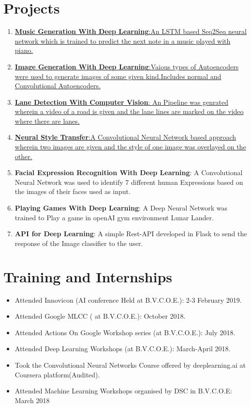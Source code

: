 \documentclass{my_cv}
\begin{document}
	\section{\colorbox{mycolor}{\textcolor{golde}{Projects}}}
	  \begin{enumerate}
	  	
	 
	  	\item \href{https://github.com/anuj2110/lstm-music-gen}{\textbf{Music Generation With Deep Learning}:An LSTM based Seq2Seq neural network which is trained to predict the next note in a music played with piano.}
	  	
	  	\item \href{https://github.com/anuj2110/keras}{\textbf{Image Generation With Deep Learning}:Vaious types of Autoencoders were used to generate images of some given kind.Includes normal and Convolutional Autoencoders.}
	  	\item \href{https://github.com/anuj2110/LaneDetection}{ \textbf{Lane Detection With Computer Vision}:
	  		An Pipeline was genrated wherein a video of a road is given and the lane lines are marked on the video where there are lanes.}
	  	\item \href{https://github.com/anuj2110/neural-style-transfer}{\textbf{Neural Style Transfer}:A Convolutional Neural Network based approach wherein two images are given and the style of one image was overlayed on the other.}
	  	\item \textbf{Facial Expression Recognition With Deep Learning}:
	  	A Convolutional Neural Network was used to identify 7 different human Expressions based on the images of their faces used as input.
	  	\item \textbf{Playing Games With Deep Learning}: A Deep Neural Network was trained to Play a game in openAI gym environment Lunar Lander.
	  	\item \textbf{API for Deep Learning}: A simple Rest-API developed in Flask to send the response of the Image classifier to the user.
	  \end{enumerate}
	\section{\colorbox{mycolor}{\textcolor{golde}{Training and Internships}}}
		\begin{itemize}
			\item Attended Innovicon (AI conference Held at B.V.C.O.E.): 2-3 February 2019.
			\item Attended Google MLCC ( at B.V.C.O.E.): October 2018.
			\item Attended Actions On Google Workshop series (at B.V.C.O.E.): July 2018.
			\item Attended Deep Learning Workshops (at B.V.C.O.E.): March-April 2018.
			\item Took the Convolutional Neural Networks Course offered by deeplearning.ai at Coursera platform(Audited).
			\item Attended Machine Learning Workshops organised by DSC in B.V.C.O.E: March 2018
			 
		\end{itemize}
\end{document}
